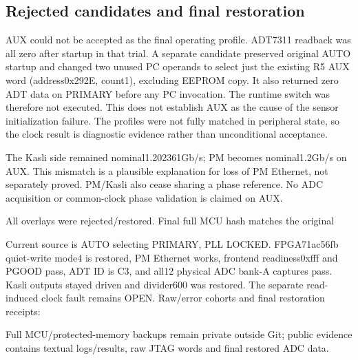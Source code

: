 \subsection{Rejected candidates and final restoration}
AUX could not be accepted as the final operating profile. ADT7311 readback was
all zero after startup in that trial. A separate candidate preserved original
AUTO startup and changed two unused PC operands to select just the existing
R5 AUX word (address0x292E, count1), excluding EEPROM copy. It also returned
zero ADT data on PRIMARY before any PC invocation. The runtime switch was
therefore not executed. This does not establish AUX as the cause of the sensor
initialization failure. The profiles were not fully matched in peripheral state,
so the clock result is diagnostic evidence rather than unconditional acceptance.

The Kasli side remained nominal1.202361Gb/s; PM becomes nominal1.2Gb/s on AUX.
This mismatch is a plausible explanation for loss of PM Ethernet, not separately
proved. PM/Kasli also cease sharing a phase reference. No ADC acquisition or
common-clock phase validation is claimed on AUX.

All overlays were rejected/restored. Final full MCU hash matches the original
\begin{center}\end{center}
Current source is AUTO selecting PRIMARY, PLL LOCKED. FPGA71ac56fb quiet-write
mode4 is restored, PM Ethernet works, frontend readiness0xfff and PGOOD pass,
ADT ID is C3, and all12 physical ADC bank-A captures pass. Kasli outputs stayed
driven and divider600 was restored. The separate read-induced clock fault
remains OPEN. Raw/error cohorts and final restoration receipts:
\begin{center}\end{center}
Full MCU/protected-memory backups remain private outside Git; public evidence
contains textual logs/results, raw JTAG words and final restored ADC data.
